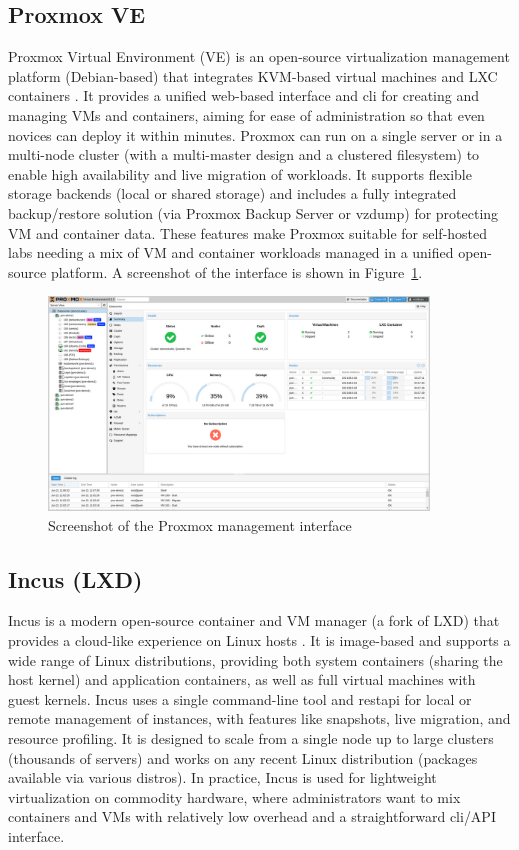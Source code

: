\subsection*{Proxmox VE}

Proxmox Virtual Environment (VE) is an open-source virtualization management platform (Debian-based) that integrates KVM-based virtual machines and LXC containers \cite{proxmox-admin-guide-2025}. It provides a unified web-based interface and \gls{cli} for creating and managing VMs and containers, aiming for ease of administration so that even novices can deploy it within minutes. Proxmox can run on a single server or in a multi-node cluster (with a multi-master design and a clustered filesystem) to enable high availability and live migration of workloads. It supports flexible storage backends (local or shared storage) and includes a fully integrated backup/restore solution (via Proxmox Backup Server or vzdump) for protecting VM and container data. These features make Proxmox suitable for self-hosted labs needing a mix of VM and container workloads managed in a unified open-source platform. A screenshot of the interface is shown in Figure~\ref{fig:proxmox-ui}.

\begin{figure}[H]
  \centering
  \includegraphics[width=0.9\textwidth]{imaxes/proxmox-ui.png}
  \caption{Screenshot of the Proxmox management interface}
  \label{fig:proxmox-ui}
\end{figure}

\subsection*{Incus (LXD)}

Incus is a modern open-source container and VM manager (a fork of LXD) that provides a cloud-like experience on Linux hosts \cite{incus-linux-containers-2023}. It is image-based and supports a wide range of Linux distributions, providing both system containers (sharing the host kernel) and application containers, as well as full virtual machines with guest kernels. Incus uses a single command-line tool and \gls{restapi} for local or remote management of instances, with features like snapshots, live migration, and resource profiling. It is designed to scale from a single node up to large clusters (thousands of servers)  and works on any recent Linux distribution (packages available via various distros). In practice, Incus is used for lightweight virtualization on commodity hardware, where administrators want to mix containers and VMs with relatively low overhead and a straightforward \gls{cli}/API interface.

